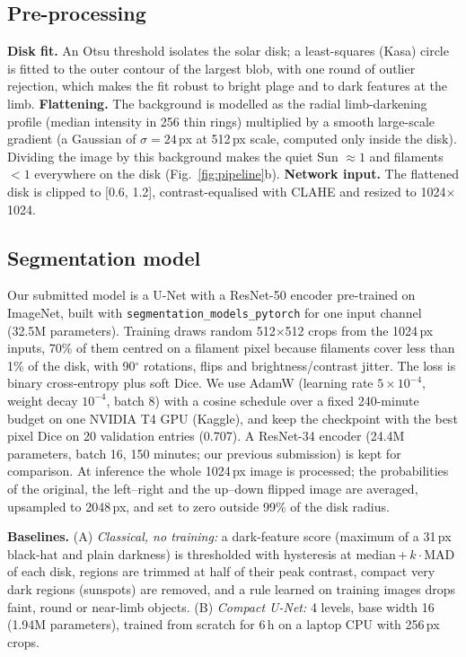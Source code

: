 \documentclass[sigconf]{acmart}
\begin{document}
\subsection{Pre-processing}
\textbf{Disk fit.} An Otsu threshold isolates the solar disk; a least-squares (Kasa) circle is fitted to the outer contour of the largest blob, with one round of outlier rejection, which makes the fit robust to bright plage and to dark features at the limb.
\textbf{Flattening.} The background is modelled as the radial limb-darkening profile (median intensity in 256 thin rings) multiplied by a smooth large-scale gradient (a Gaussian of $\sigma=24$\,px at 512\,px scale, computed only inside the disk). Dividing the image by this background makes the quiet Sun $\approx 1$ and filaments $<1$ everywhere on the disk (Fig.~\ref{fig:pipeline}b).
\textbf{Network input.} The flattened disk is clipped to [0.6, 1.2], contrast-equalised with CLAHE and resized to 1024$\times$1024.

\subsection{Segmentation model}
Our submitted model is a U-Net with a ResNet-50 encoder \cite{he2016resnet} pre-trained on ImageNet, built with \texttt{segmentation\_models\_pytorch} \cite{iakubovskii2019smp} for one input channel (32.5M parameters). Training draws random 512$\times$512 crops from the 1024\,px inputs, 70\% of them centred on a filament pixel because filaments cover less than 1\% of the disk, with 90$^\circ$ rotations, flips and brightness/contrast jitter. The loss is binary cross-entropy plus soft Dice. We use AdamW (learning rate $5\times10^{-4}$, weight decay $10^{-4}$, batch 8) with a cosine schedule over a fixed 240-minute budget on one NVIDIA T4 GPU (Kaggle), and keep the checkpoint with the best pixel Dice on 20 validation entries (0.707). A ResNet-34 encoder (24.4M parameters, batch 16, 150 minutes; our previous submission) is kept for comparison. At inference the whole 1024\,px image is processed; the probabilities of the original, the left--right and the up--down flipped image are averaged, upsampled to 2048\,px, and set to zero outside 99\% of the disk radius.

\textbf{Baselines.} (A) \emph{Classical, no training:} a dark-feature score (maximum of a 31\,px black-hat and plain darkness) is thresholded with hysteresis at median\,+\,$k\cdot$MAD of each disk, regions are trimmed at half of their peak contrast, compact very dark regions (sunspots) are removed, and a rule learned on training images drops faint, round or near-limb objects. (B) \emph{Compact U-Net:} 4 levels, base width 16 (1.94M parameters), trained from scratch for 6\,h on a laptop CPU with 256\,px crops.
\end{document}
